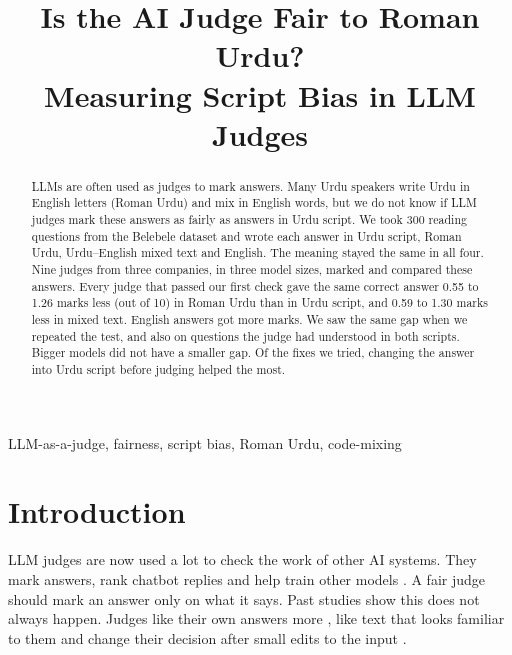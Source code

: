 \documentclass[conference]{IEEEtran}
\begin{document}
\title{Is the AI Judge Fair to Roman Urdu?\\ Measuring Script Bias in LLM Judges}

\author{
}

\maketitle

\begin{abstract}
LLMs are often used as judges to mark answers. Many Urdu speakers write Urdu in English letters (Roman Urdu) and mix in
English words, but we do not know if LLM judges mark these answers as fairly as answers in Urdu script. We took 300
reading questions from the Belebele dataset and wrote each answer in Urdu script, Roman Urdu, Urdu--English mixed text
and English. The meaning stayed the same in all four. Nine judges from three companies, in three model sizes, marked and
compared these answers. Every judge that passed our first check gave the same correct answer 0.55 to 1.26 marks less
(out of 10) in Roman Urdu than in Urdu script, and 0.59 to 1.30 marks less in mixed text. English answers got more
marks. We saw the same gap when we repeated the test, and also on questions the judge had understood in both scripts.
Bigger models did not have a smaller gap. Of the fixes we tried, changing the answer into Urdu script before judging
helped the most.
\end{abstract}

\begin{IEEEkeywords}
LLM-as-a-judge, fairness, script bias, Roman Urdu, code-mixing
\end{IEEEkeywords}

\section{Introduction}
LLM judges are now used a lot to check the work of other AI systems. They mark answers, rank chatbot replies and help
train other models \cite{zheng2023judging}. A fair judge should mark an answer only on what it says. Past studies show
this does not always happen. Judges like their own answers more \cite{panickssery2024llm}, like text that looks familiar
to them \cite{wataoka2024self} and change their decision after small edits to the input \cite{ye2025justice}.
\end{document}
